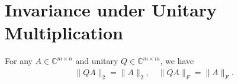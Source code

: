 \section{Invariance under Unitary Multiplication} 

\begin{theorem}
\label{thm: invar under unitary multiplication}
 For any $A \in \mathbb{C}^{m \times n}$ and unitary $Q \in \mathbb{C}^{m \times m}$, we have
\begin{align*}
\|Q A\|_2=\|A\|_2, \quad\|Q A\|_F=\|A\|_F. 
\end{align*}
\end{theorem}
